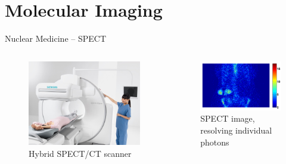 \section{Molecular Imaging}


\begin{frame}[c]{Nuclear Medicine -- SPECT}
	\begin{columns}[c, onlytextwidth]
		\begin{column}{0.5\textwidth}
			\centering{}
			\begin{figure}[k]
				\centering

				\includegraphics[height=0.7\linewidth]{images/SH_MI_37127_13.jpg}
				\caption{Hybrid SPECT/CT scanner}
			\end{figure}
		\end{column}\begin{column}{0.5\textwidth}
			\begin{figure}
				\centering{}
				\includegraphics[width=1.0\linewidth]{images/boneproj.png}
				\caption{SPECT image, resolving individual photons}
			\end{figure}
		\end{column}
	\end{columns}

\end{frame}

